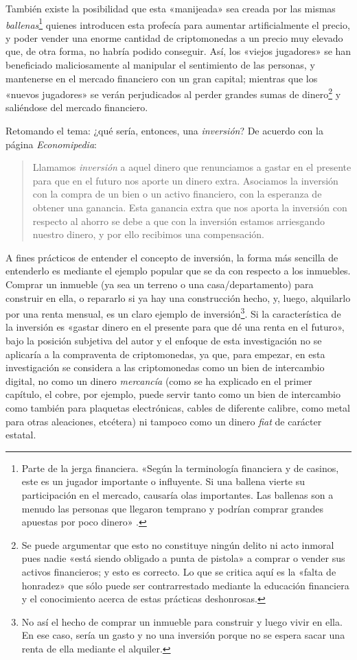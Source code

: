 \documentclass[12pt,a4paper,twoside]{book}
\begin{document}
También existe la posibilidad que esta «manijeada» sea creada por las mismas \textit{ballenas}\footnote{Parte de la jerga financiera. «Según la terminología financiera y de casinos, este es un jugador importante o influyente. Si una ballena vierte su participación en el mercado, causaría olas importantes. Las ballenas son a menudo las personas que llegaron temprano y podrían comprar grandes apuestas por poco dinero» \cite{def:ballena}.} quienes introducen esta profecía para aumentar artificialmente el precio, y poder vender una enorme cantidad de criptomonedas a un precio muy elevado que, de otra forma, no habría podido conseguir. Así, los «viejos jugadores» se han beneficiado maliciosamente al manipular el sentimiento de las personas, y mantenerse en el mercado financiero con un gran capital; mientras que los «nuevos jugadores» se verán perjudicados al perder grandes sumas de dinero\footnote{Se puede argumentar que esto no constituye ningún delito ni acto inmoral pues nadie «está siendo obligado a punta de pistola» a comprar o vender sus activos financieros; y esto es correcto. Lo que se critica aquí es la «falta de honradez» que sólo puede ser contrarrestado mediante la educación financiera y el conocimiento acerca de estas prácticas deshonrosas.} y saliéndose del mercado financiero.

Retomando el tema: ¿qué sería, entonces, una \textit{inversión}? De acuerdo con la página \textit{Economipedia}:

\begin{quotation}
Llamamos \textit{inversión} a aquel dinero que renunciamos a gastar en el presente para que en el futuro nos aporte un dinero extra. Asociamos la inversión con la compra de un bien o un activo financiero, con la esperanza de obtener una ganancia. Esta ganancia extra que nos aporta la inversión con respecto al ahorro se debe a que con la inversión estamos arriesgando nuestro dinero, y por ello recibimos una compensación. \cite{epedia:inversion}
\end{quotation}

A fines prácticos de entender el concepto de inversión, la forma más sencilla de entenderlo es mediante el ejemplo popular que se da con respecto a los inmuebles. Comprar un inmueble (ya sea un terreno o una casa/departamento) para construir en ella, o repararlo si ya hay una construcción hecho, y, luego, alquilarlo por una renta mensual, es un claro ejemplo de inversión\footnote{No así el hecho de comprar un inmueble para construir y luego vivir en ella. En ese caso, sería un gasto y no una inversión porque no se espera sacar una renta de ella mediante el alquiler.}. Si la característica de la inversión es «gastar dinero en el presente para que dé una renta en el futuro», bajo la posición subjetiva del autor y el enfoque de esta investigación no se aplicaría a la compraventa de criptomonedas, ya que, para empezar, en esta investigación se considera a las criptomonedas como un bien de intercambio digital, no como un dinero \textit{mercancía} (como se ha explicado en el primer capítulo, el cobre, por ejemplo, puede servir tanto como un bien de intercambio como también para plaquetas electrónicas, cables de diferente calibre, como metal para otras aleaciones, etcétera) ni tampoco como un dinero \textit{fiat} de carácter estatal.
\end{document}
